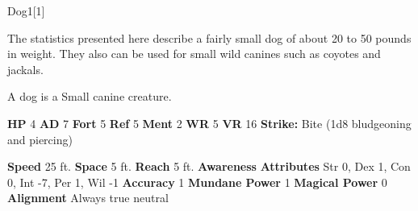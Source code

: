  
  \begin{monsection}{Dog}{1}[1]
    \vspace{-1em}\vspace{-1em}
    \vspace{0em}

    
     The statistics presented here describe a fairly small dog of about 20 to 50 pounds in weight.
     They also can be used for small wild canines such as coyotes and jackals.
    
        A dog is a Small canine creature.
      

    \begin{spellcontent}
      \begin{spelltargetinginfo}
        \pari \textbf{HP} 4 \monsep
          \textbf{AD} 7 \monsep
          \textbf{Fort} 5 \monsep
          \textbf{Ref} 5 \monsep
          \textbf{Ment} 2
        \pari \textbf{WR} 5 \monsep
        \textbf{VR} 16
        \pari \textbf{Strike:}
            Bite  (1d8 bludgeoning and piercing)
      \end{spelltargetinginfo}
    \end{spellcontent}
    \begin{monsterfooter}
      \pari \textbf{Speed} 25 ft. \monsep
        \textbf{Space} 5 ft. \monsep
        \textbf{Reach} 5 ft.
      \pari \textbf{Awareness} 
      \pari \textbf{Attributes}
        Str 0, Dex 1,
        Con 0, Int -7,
        Per 1, Wil -1
      \pari \textbf{Accuracy} 1 \monsep
        \textbf{Mundane Power} 1 \monsep
      \textbf{Magical Power} 0
      \pari \textbf{Alignment} Always true neutral
    \end{monsterfooter}
  \end{monsection}
  
